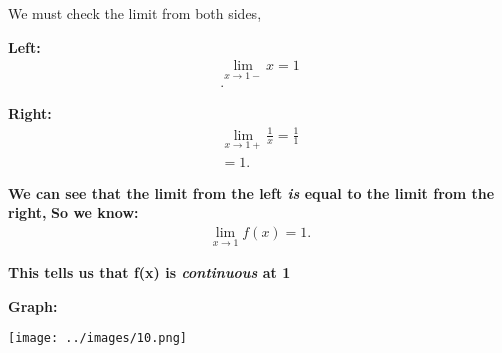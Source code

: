 \documentclass{report}
\begin{document}
        \bigbreak \noindent 
        We must check the limit from both sides, 

        \bigbreak \noindent 
        \textbf{Left:}
        \begin{align*}
            \lim\limits_{x \to 1-}{x} = 1 \\ 
        .\end{align*}

        \bigbreak \noindent 
        \textbf{Right:}
        \begin{align*}
            \lim\limits_{x \to 1+}{ \frac{1}{x}} = \frac{1}{1} \\ 
            =  1
        .\end{align*}

        \bigbreak \noindent 
        \textbf{We can see that the limit from the left \textbf{\textit{is}} equal to the limit 
            from the right, 
        }
        \textbf{So we know:}
        \begin{align*}
            \lim\limits_{x \to 1}{f \left(x\right)} = 1
        .\end{align*}

        \bigbreak \noindent 
        \textbf{This tells us that f(x) is \textbf{\textit{continuous}} at \textbf{1}}

        \bigbreak \noindent \bigbreak \noindent 
        \begin{large}
            \textbf{Graph:}
        \end{large}

        \bigbreak \noindent \bigbreak \noindent 
        \begin{center}
            \texttt{[image: ../images/10.png]}
        \end{center}

        \bigbreak \noindent 
\end{document}
